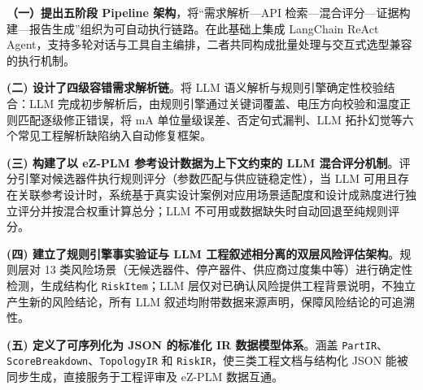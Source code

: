 \textbf{（一）提出五阶段 Pipeline 架构}，将“需求解析—API 检索—混合评分—证据构建—报告生成”组织为可自动执行链路。在此基础上集成 LangChain ReAct Agent\cite{yao2022react}，支持多轮对话与工具自主编排，二者共同构成批量处理与交互式选型兼容的执行机制。

\textbf{(二) 设计了四级容错需求解析链}。将 LLM 语义解析与规则引擎确定性校验结合：LLM 完成初步解析后，由规则引擎通过关键词覆盖、电压方向校验和温度正则匹配逐级修正错误，将 mA 单位量级误差、否定句式漏判、LLM 拓扑幻觉等六个常见工程解析缺陷纳入自动修复框架。

\textbf{(三) 构建了以 eZ-PLM 参考设计数据为上下文约束的 LLM 混合评分机制}。评分引擎对候选器件执行规则评分（参数匹配与供应链稳定性），当 LLM 可用且存在关联参考设计时，系统基于真实设计案例对应用场景适配度和设计成熟度进行独立评分并按混合权重计算总分；LLM 不可用或数据缺失时自动回退至纯规则评分。

\textbf{(四) 建立了规则引擎事实验证与 LLM 工程叙述相分离的双层风险评估架构}。规则层对 13 类风险场景（无候选器件、停产器件、供应商过度集中等）进行确定性检测，生成结构化 \texttt{RiskItem}；LLM 层仅对已确认风险提供工程背景说明，不独立产生新的风险结论，所有 LLM 叙述均附带数据来源声明，保障风险结论的可追溯性。

\textbf{(五) 定义了可序列化为 JSON 的标准化 IR 数据模型体系}。涵盖 \texttt{PartIR}、\texttt{ScoreBreakdown}、\texttt{TopologyIR} 和 \texttt{RiskIR}，使三类工程文档与结构化 JSON 能被同步生成，直接服务于工程评审及 eZ-PLM 数据互通。

